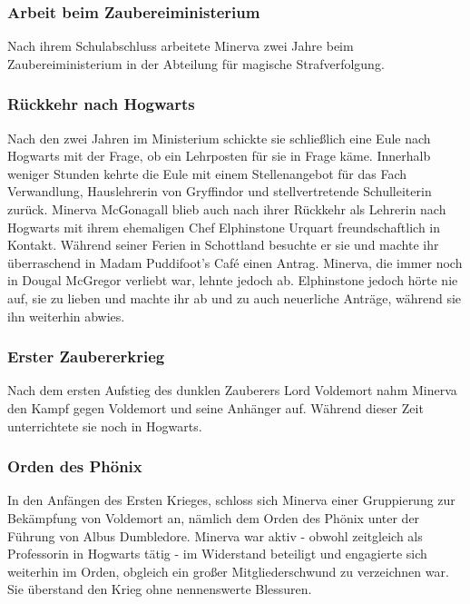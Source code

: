 \documentclass[a4paper, 10pt]{article}
\begin{document}
\subsubsection*{\large Arbeit beim Zaubereiministerium}
Nach ihrem Schulabschluss arbeitete Minerva zwei Jahre beim Zaubereiministerium in der Abteilung für magische Strafverfolgung.
\subsubsection*{\large Rückkehr nach Hogwarts}
Nach den zwei Jahren im Ministerium schickte sie schließlich eine Eule nach Hogwarts mit der Frage, ob ein Lehrposten für sie in Frage käme. Innerhalb weniger Stunden kehrte die Eule mit einem Stellenangebot für das Fach Verwandlung, Hauslehrerin von Gryffindor und stellvertretende Schulleiterin zurück.
\vspace{10pt}
\newline
Minerva McGonagall blieb auch nach ihrer Rückkehr als Lehrerin nach Hogwarts mit ihrem ehemaligen Chef Elphinstone Urquart freundschaftlich in Kontakt. Während seiner Ferien in Schottland besuchte er sie und machte ihr überraschend in Madam Puddifoot's Café einen Antrag. Minerva, die immer noch in Dougal McGregor verliebt war, lehnte jedoch ab. Elphinstone jedoch hörte nie auf, sie zu lieben und machte ihr ab und zu auch neuerliche Anträge, während sie ihn weiterhin abwies.
\subsubsection*{\large Erster Zaubererkrieg}
Nach dem ersten Aufstieg des dunklen Zauberers Lord Voldemort nahm Minerva den Kampf gegen Voldemort und seine Anhänger auf. Während dieser Zeit unterrichtete sie noch in Hogwarts.
\subsubsection*{\large Orden des Phönix}
In den Anfängen des Ersten Krieges, schloss sich Minerva einer Gruppierung zur Bekämpfung von Voldemort an, nämlich dem Orden des Phönix unter der Führung von Albus Dumbledore. Minerva war aktiv - obwohl zeitgleich als Professorin in Hogwarts tätig -  im Widerstand beteiligt und engagierte sich weiterhin im Orden, obgleich ein großer Mitgliederschwund zu verzeichnen war. Sie überstand den Krieg ohne nennenswerte Blessuren.
\end{document}
